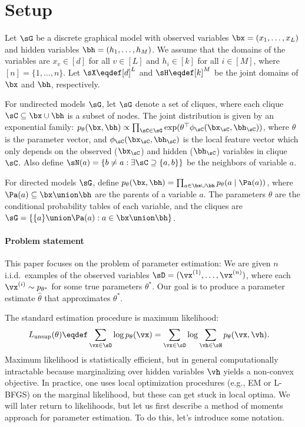 \section{Setup}
\label{sec:setup}

Let $\sG$ be a discrete graphical model with
observed variables $\bx = (x_1, \dots, x_L)$ and
hidden variables $\bh = (h_{1}, \dots, h_M)$.
We assume that the domains of the variables
are $x_v \in [d]$ for all $v \in [L]$
and $h_i \in [k]$ for all $i \in [M]$,
where $[n] = \{ 1, \dots, n \}$.
Let $\sX \eqdef [d]^L$ and $\sH \eqdef [k]^{M}$ be the joint domains of $\bx$ and $\bh$, respectively.

For undirected models $\sG$,
let $\sG$ denote a set of cliques, where each clique $\sC \subseteq \bx \cup \bh$ is a subset of nodes.
The joint distribution is given by an exponential family:
  $p_\theta(\bx,\bh) \propto \prod_{\sC \in \sG} \exp(\theta^\top\phi_\sC(\bx_\sC, \bh_\sC))$,
  where $\theta$ is the parameter vector,
  and $\phi_\sC(\bx_\sC, \bh_\sC)$ is the local feature vector
  which only depends on the observed ($\bx_\sC$) and hidden ($\bh_\sC$) variables in clique $\sC$.
  Also define $\sN(a) = \{ b \neq a : \exists \sC \supseteq \{ a, b \} \}$ be the neighbors of variable $a$.

For directed models $\sG$,
  define $p_\theta(\bx,\bh) = \prod_{a \in \bx \cup \bh} p_\theta(a \mid \Pa(a))$,
  where $\Pa(a) \subseteq \bx \union \bh$ are the parents of a variable $a$.
  The parameters $\theta$ are the conditional probability tables of each variable,
  and the cliques are $\sG = \{ \{ a \} \union \Pa(a) : a \in \bx \union \bh \}$.

\paragraph{Problem statement}

This paper focuses on the problem of parameter estimation:
We are given $n$ i.i.d.~examples of the observed variables $\sD
  = (\vx^{(1)}, \dots, \vx^{(n)})$, where each $\vx^{(i)} \sim p_{\theta^*}$ for
  some true parameters $\theta^*$.
Our goal is to produce a parameter estimate $\hat\theta$ that
  approximates $\theta^*$.

The standard estimation procedure is maximum likelihood:
  \begin{align*}
    L_\text{unsup}(\theta) &\eqdef \sum_{\vx \in \sD} \log p_\theta(\vx)
        =  \sum_{\vx \in \sD} \log \sum_{\vh \in \sH} p_\theta(\vx,\vh).
  \end{align*}
  Maximum likelihood is statistically efficient,
  but in general computationally intractable
  because marginalizing over hidden variables $\vh$ yields a non-convex objective.
In practice, one uses local optimization procedures (e.g., EM
  or L-BFGS) on the marginal likelihood, but these can get stuck in local
  optima.
We will later return to likelihoods, but let us first
describe a method of moments approach for parameter estimation.
To do this, let's introduce some notation.

